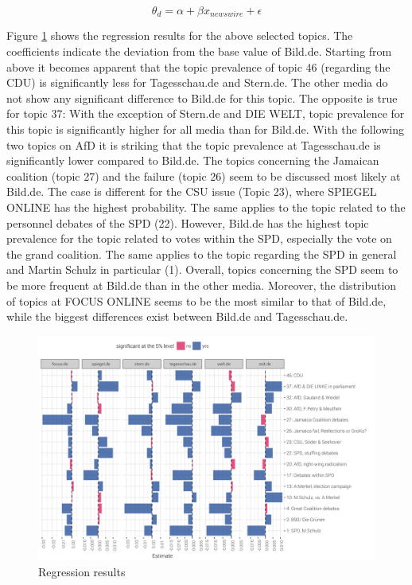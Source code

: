 \documentclass[12pt,a4paper,notitlepage]{article}
\begin{document}
\begin{equation}\label{eq_1}
	\theta_d=\alpha+\beta x_{newswire}+\epsilon
\end{equation}

Figure \ref{fig_estimateEffects} shows the regression results for the above selected topics. The coefficients indicate the deviation from the base value of Bild.de. Starting from above it becomes apparent that the topic prevalence of topic 46 (regarding the CDU) is significantly less for Tagesschau.de and Stern.de. The other media do not show any significant difference to Bild.de for this topic. The opposite is true for topic 37: With the exception of Stern.de and DIE WELT, topic prevalence for this topic is significantly higher for all media than for Bild.de. With the following two topics on AfD it is striking that the topic prevalence at Tagesschau.de is significantly lower compared to Bild.de. The topics concerning the Jamaican coalition (topic 27) and the failure (topic 26) seem to be discussed most likely at Bild.de. The case is different for the CSU issue (Topic 23), where SPIEGEL ONLINE has the highest probability. The same applies to the topic related to the personnel debates of the SPD (22). However, Bild.de has the highest topic prevalence for the topic related to votes within the SPD, especially the vote on the grand coalition. The same applies to the topic regarding the SPD in general and Martin Schulz in particular (1). Overall, topics concerning the SPD seem to be more frequent at Bild.de than in the other media. Moreover, the distribution of topics at FOCUS ONLINE seems to be the most similar to that of Bild.de, while the biggest differences exist between Bild.de and Tagesschau.de. 

\begin{figure}[H]
	\caption{Regression results}
		\begin{center}
			\includegraphics[width=\textwidth,keepaspectratio]{../figs/estimates.png}
		\end{center}
	\label{fig_estimateEffects}
\end{figure}
\end{document}
